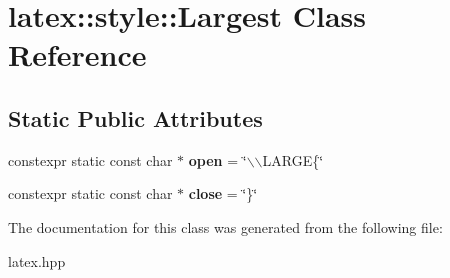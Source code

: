 \hypertarget{classlatex_1_1style_1_1Largest}{\section{latex\-:\-:style\-:\-:\-Largest \-Class \-Reference}
\label{classlatex_1_1style_1_1Largest}
}
\subsection*{\-Static \-Public \-Attributes}
\begin{DoxyCompactItemize}
\item 
\hypertarget{classlatex_1_1style_1_1Largest_adbb0b19eadf9f950f410b654d6f8ba05}{constexpr static const char $\ast$ {\bfseries open} = \char`\"{}$\backslash$$\backslash$\-L\-A\-R\-G\-E\{\char`\"{}}\label{classlatex_1_1style_1_1Largest_adbb0b19eadf9f950f410b654d6f8ba05}

\item 
\hypertarget{classlatex_1_1style_1_1Largest_a678cae6a7d34ed7d6e7f87bd966a81fd}{constexpr static const char $\ast$ {\bfseries close} = \char`\"{}\}\char`\"{}}\label{classlatex_1_1style_1_1Largest_a678cae6a7d34ed7d6e7f87bd966a81fd}

\end{DoxyCompactItemize}


\-The documentation for this class was generated from the following file\-:\begin{DoxyCompactItemize}
\item 
latex.\-hpp\end{DoxyCompactItemize}
